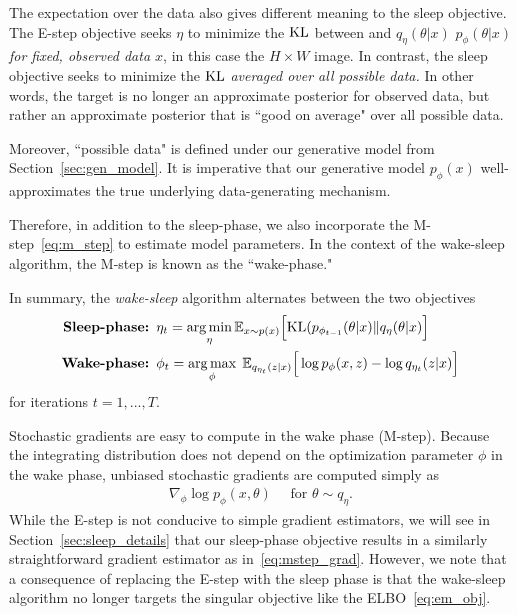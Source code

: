 The expectation over the data also gives different meaning to the sleep objective. The E-step objective seeks $\eta$ to minimize the $\textrm{KL}$ between and $q_\eta(\theta | x)$ $p_\phi(\theta | x)$ {\itshape for fixed, observed data $x$},
in this case the $H\times W$ image. In contrast, the sleep objective seeks to minimize the $\textrm{KL}$ {\itshape averaged over all possible data. } In other words, the target is no longer an approximate posterior for observed data, but rather an approximate posterior that is ``good on average" over all possible data.

Moreover, ``possible data" is defined under our generative model from Section~\ref{sec:gen_model}. It is imperative that our generative model $p_\phi(x)$ well-approximates the true underlying data-generating mechanism. 

Therefore, in addition to the sleep-phase, we also incorporate the M-step~\eqref{eq:m_step} to estimate model parameters. In the context of the wake-sleep algorithm, the M-step is known as the ``wake-phase."

In summary, the {\itshape wake-sleep} algorithm alternates between the two objectives 
\begin{align}
    \text{{\bf Sleep-phase: }} & 
    \eta_{t} = \operatorname*{arg\,min}_{\eta} \mathbb{E}_{x \sim p(x)}\Big[\textrm{KL}(p_{\phi_{t-1}}(\theta | x) \| q_\eta(\theta | x)\Big]
    \label{eq:sleep_phase_summary}
    \\
    \text{{\bf Wake-phase: }} & \phi_{t} = \operatorname*{arg\,max}_{\phi}\; \mathbb{E}_{q_{\eta_t}(z | x)}\Big[\log p_{\phi}(x, z) - \log q_{\eta_t}(z | x)\Big]
    \label{eq:wake_phase_summary}
\end{align} 
for iterations $t = 1, ..., T$. 

Stochastic gradients are easy to compute in the wake phase (M-step). Because the integrating distribution does not depend on the optimization parameter $\phi$ in the wake phase, unbiased stochastic gradients are computed simply as 
\begin{align}
    \nabla_\phi \log p_\phi(x, \theta) \quad \text{ for } \theta\sim q_\eta. 
    \label{eq:mstep_grad}
\end{align}
While the E-step is not conducive to simple gradient estimators, we will see in Section~\ref{sec:sleep_details} that our sleep-phase objective
results in a similarly straightforward gradient estimator as in~\eqref{eq:mstep_grad}. However,
we note that a consequence of replacing the E-step with the sleep phase is that the wake-sleep algorithm no longer targets the singular objective like the ELBO~\eqref{eq:em_obj}. 

